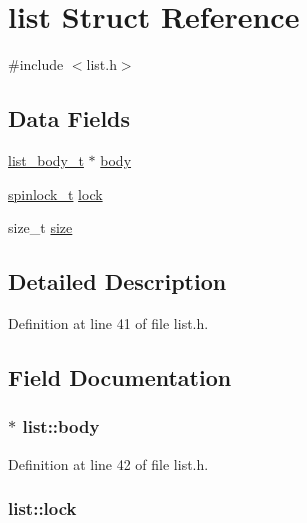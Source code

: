 \hypertarget{structlist}{\section{list Struct Reference}
\label{structlist}
}


{\ttfamily \#include $<$list.\+h$>$}

\subsection*{Data Fields}
\begin{DoxyCompactItemize}
\item 
\hyperlink{list_8h_a26009b16c17e2336df1025f49f3ebd7e}{list\+\_\+body\+\_\+t} $\ast$ \hyperlink{structlist_a86cadf6e44fd6505728c5149b336d3db}{body}
\item 
\hyperlink{spinlock_8h_a7d562148dafb0dacf0ee876d482ed090}{spinlock\+\_\+t} \hyperlink{structlist_a38fd85cafd1f71a39e83dd37b37ffbf4}{lock}
\item 
size\+\_\+t \hyperlink{structlist_ae581be90bd8eb7051528b61ad216de88}{size}
\end{DoxyCompactItemize}


\subsection{Detailed Description}


Definition at line 41 of file list.\+h.



\subsection{Field Documentation}
\hypertarget{structlist_a86cadf6e44fd6505728c5149b336d3db}{
\subsubsection[{body}]{$\ast$ list\+::body}}\label{structlist_a86cadf6e44fd6505728c5149b336d3db}


Definition at line 42 of file list.\+h.

\hypertarget{structlist_a38fd85cafd1f71a39e83dd37b37ffbf4}{
\subsubsection[{lock}]{ list\+::lock}}\label{structlist_a38fd85cafd1f71a39e83dd37b37ffbf4}


